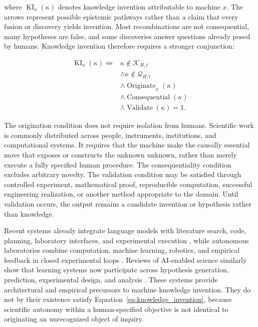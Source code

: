 where $\operatorname{KI}_{x}(\kappa)$ denotes knowledge invention attributable
to machine $x$. The arrows represent possible epistemic pathways rather than a
claim that every fusion or discovery yields invention. Most recombinations are
not consequential, many hypotheses are false, and some discoveries answer
questions already posed by humans. Knowledge invention therefore requires a
stronger conjunction:

\begin{equation}
\begin{aligned}
\operatorname{KI}_{x}(\kappa)
\Longleftrightarrow{}&
\kappa \notin \mathcal{K}_{H,t}\\
&\land \kappa \notin \mathcal{Q}_{H,t}\\
&\land \operatorname{Originate}_{x}(\kappa)\\
&\land \operatorname{Consequential}(\kappa)\\
&\land \operatorname{Validate}(\kappa)=1.
\end{aligned}
\label{eq:knowledge_invention}
\end{equation}

The origination condition does not require isolation from humans. Scientific
work is commonly distributed across people, instruments, institutions, and
computational systems. It requires that the machine make the causally essential
move that exposes or constructs the unknown unknown, rather than merely execute
a fully specified human procedure. The consequentiality condition excludes
arbitrary novelty. The validation condition may be satisfied through
controlled experiment, mathematical proof, reproducible computation,
successful engineering realization, or another method appropriate to the
domain. Until validation occurs, the output remains a candidate invention or
hypothesis rather than knowledge.

Recent systems already integrate language models with literature search, code,
planning, laboratory interfaces, and experimental execution
\cite{boiko2023autonomous}, while autonomous laboratories combine computation,
machine learning, robotics, and empirical feedback in closed experimental loops
\cite{szymanski2023autonomous}. Reviews of AI-enabled science similarly show
that learning systems now participate across hypothesis generation, prediction,
experimental design, and analysis \cite{wang2023scientific}. These systems
provide architectural and empirical precursors to machine knowledge invention.
They do not by their existence satisfy Equation~\eqref{eq:knowledge_invention},
because scientific autonomy within a human-specified objective is not identical
to originating an unrecognized object of inquiry.

